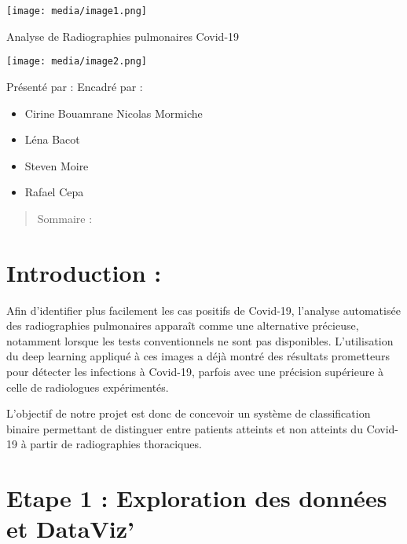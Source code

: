 \textbf{
}\texttt{[image: media/image1.png]}

Analyse de Radiographies pulmonaires Covid-19

\texttt{[image: media/image2.png]}

Présenté par : Encadré par :

\begin{itemize}
\tightlist
\item
  Cirine Bouamrane Nicolas Mormiche
\item
  Léna Bacot
\item
  Steven Moire
\item
  Rafael Cepa
\end{itemize}

\begin{quote}
Sommaire :
\end{quote}

\begin{quote}
\end{quote}

\section[Introduction
:]{\texorpdfstring{\protect\hypertarget{anchor}{}{}\protect\hypertarget{anchor-1}{}{}\protect\hypertarget{anchor-2}{}{}Introduction
:}{Introduction :}}\label{introduction}

Afin d'identifier plus facilement les cas positifs de Covid-19,
l'analyse automatisée des radiographies pulmonaires apparaît comme une
alternative précieuse, notamment lorsque les tests conventionnels ne
sont pas disponibles. L'utilisation du deep learning appliqué à ces
images a déjà montré des résultats prometteurs pour détecter les
infections à Covid-19, parfois avec une précision supérieure à celle de
radiologues expérimentés.

L'objectif de notre projet est donc de concevoir un système de
classification binaire permettant de distinguer entre patients atteints
et non atteints du Covid-19 à partir de radiographies thoraciques.

\section[Etape 1 : Exploration des données et
DataViz']{\texorpdfstring{\protect\hypertarget{anchor-3}{}{}\protect\hypertarget{anchor-4}{}{}\protect\hypertarget{anchor-5}{}{}Etape
1 : Exploration des données et
DataViz'}{Etape 1 : Exploration des données et DataViz'}}\label{etape-1-exploration-des-donnuxe9es-et-dataviz}

